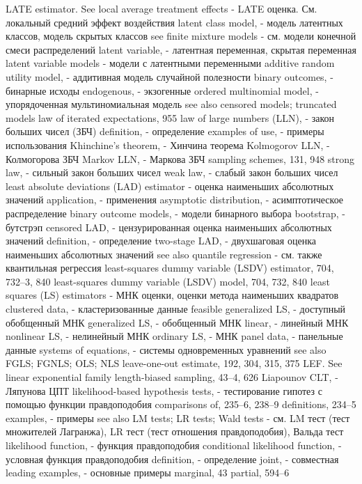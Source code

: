 LATE estimator. See local average treatment effects - LATE оценка. См. локальный средний эффект воздействия
latent class model, - модель латентных классов, модель скрытых классов
see finite mixture models - см. модели конечной смеси распределений
latent variable, - латентная переменная, скрытая переменная
latent variable models - модели с латентными переменными
additive random utility model, - аддитивная модель случайной полезности 
binary outcomes, - бинарные исходы
endogenous, - экзогенные
ordered multinomial model, - упорядоченная мультиномиальная модель 
see also censored models; truncated models
law of iterated expectations, 955
law of large numbers (LLN), - закон больших чисел (ЗБЧ)
definition, - определение
examples of use, - примеры использования 
Khinchine’s theorem, - Хинчина теорема
Kolmogorov LLN, - Колмогорова ЗБЧ 
Markov LLN, - Маркова ЗБЧ
sampling schemes, 131, 948 
strong law, - сильный закон больших чисел
weak law, - слабый закон больших чисел
least absolute deviations (LAD) estimator - оценка наименьших абсолютных значений
application, - применения
asymptotic distribution, - асимптотическое распределение
binary outcome models, - модели бинарного выбора
bootstrap, - бутстрэп
censored LAD, - цензурированная оценка наименьших абсолютных значений
definition, - определение
two-stage LAD, - двухшаговая оценка наименьших абсолютных значений
see also quantile regression - см. также квантильная регрессия
least-squares dummy variable (LSDV) estimator, 704, 732–3, 840
least-squares dummy variable (LSDV) model, 704, 732, 840
least squares (LS) estimators - МНК оценки, оценки метода наименьших квадратов
clustered data, - кластеризованные данные
feasible generalized LS, - доступный обобщенный МНК 
generalized LS, - обобщенный МНК
linear, - линейный МНК
nonlinear LS, - нелинейный МНК
ordinary LS, - МНК
panel data, - панельные данные
systems of equations, - системы одновременных уравнений
see also FGLS; FGNLS; OLS; NLS leave-one-out estimate, 192, 304, 315, 375 LEF. See linear exponential family length-biased sampling, 43–4, 626 
Liapounov CLT, - Ляпунова ЦПТ 
likelihood-based hypothesis tests, - тестирование гипотез с помощью функции правдоподобия
comparisons of, 235–6, 238–9 definitions, 234–5
examples, - примеры
see also LM tests; LR tests; Wald tests - см. LM тест (тест множителей Лагранжа), LR тест (тест отношения правдоподобия), Вальда тест
likelihood function, - функция правдоподобия
conditional likelihood function, - условная функция правдоподобия 
definition, - определение
joint, - совместная
leading examples, - основные примеры
marginal, 43
partial, 594–6

